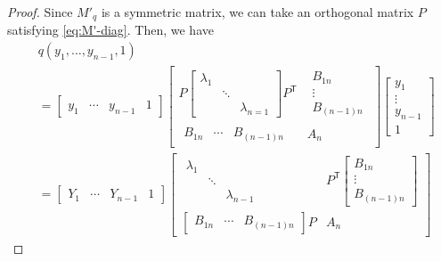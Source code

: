 \documentclass[pdftex,a4paper,12pt]{scrartcl}
\theoremstyle{plain}
\theoremstyle{definition}
\theoremstyle{remark}
\begin{document}
\begin{proof}
Since $M'_q$ is a symmetric matrix, we can take an orthogonal matrix $P$ satisfying \eqref{eq:M'-diag}.
Then, we have
\[
\begin{split}
& q(y_1,\dots,y_{n-1},1) \\
&=
\begin{bmatrix}
y_1 & \cdots & y_{n-1} & 1
\end{bmatrix}
\left[
\begin{array}{c|c}
  P
  \begin{bmatrix}
  \lambda_1 && \\
  & \ddots & \\
  && \lambda_{n=1}
  \end{bmatrix}
     P^{\mathsf T}
  &
    \begin{matrix}
    B_{1n} \\ \vdots \\ B_{(n-1)n}
    \end{matrix}
  \\\hline
  \begin{matrix}
  B_{1n} & \cdots & B_{(n-1)n}
  \end{matrix}
      & A_n
\end{array}
\right]
\begin{bmatrix}
y_1 \\ \vdots \\ y_{n-1} \\ 1
\end{bmatrix}
\\
&=
\begin{bmatrix}
Y_1 & \cdots & Y_{n-1} & 1
\end{bmatrix}
\left[
\begin{array}{c|c}
  \begin{matrix}
  \lambda_1 && \\ & \ddots & \\ && \lambda_{n-1}
  \end{matrix}
             & P^{\mathsf T}
               \begin{bmatrix}
               B_{1n} \\ \vdots \\ B_{(n-1)n}
               \end{bmatrix}
  \\\hline
  \begin{bmatrix}
  B_{1n} & \cdots & B_{(n-1)n}
  \end{bmatrix} P
                 & A_n
\end{array}
\right]

\end{split}\]
\end{proof}
\end{document}
